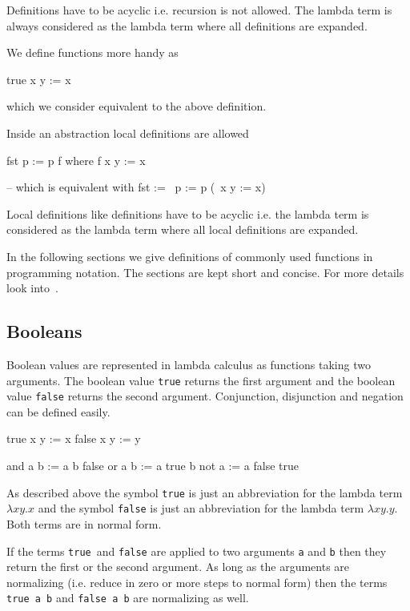\documentclass[12pt]{article}
\begin{document}
Definitions have to be acyclic i.e. recursion is
not allowed. The lambda term is always considered as the lambda term where all
definitions are expanded.

We define functions more handy as
\begin{lam}
    true x y := x
\end{lam}
which we consider equivalent to the above definition.

Inside an abstraction local definitions are allowed
\begin{lam}
    fst p :=
        p f where
            f x y := x

    -- which is equivalent with
    fst := \ p := p (\ x y := x)
\end{lam}
Local definitions like definitions have to be acyclic i.e. the lambda term is
considered as the lambda term where all local definitions are expanded.


In the following sections we give definitions of commonly used functions in
programming notation. The sections are kept short and concise. For more details
look into~\cite{brandl-lambda-programming}.





\subsection{Booleans}
\label{sec-booleans}


Boolean values are represented in lambda calculus as functions taking two
arguments. The boolean value {\tt true} returns the first argument and the
boolean value {\tt false} returns the second argument. Conjunction, disjunction
and negation can be defined easily.

\begin{lam}
    true  x y := x
    false x y := y

    and a b := a b false
    or  a b := a true b
    not a   := a false true
\end{lam}


As described above the symbol {\tt true} is just an abbreviation for the lambda
term $\lambda x y . x$ and the symbol {\tt false} is just an abbreviation for
the lambda term $\lambda x y . y$. Both terms are in normal form.

If the terms {\tt true} and {\tt false} are applied to two arguments {\tt a} and
{\tt b} then they return
the first or the second argument. As long as the arguments are normalizing
(i.e. reduce in zero or more steps to normal form) then the terms {\tt true a b}
and {\tt false a b} are normalizing as well.
\end{document}
